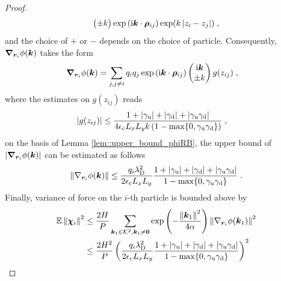 \begin{proof}
\begin{align*}
\begin{pmatrix}
 \pm k  \end{pmatrix}\exp{(\mathrm{i} \boldsymbol{k} \cdot \boldsymbol{\rho}_{ij})}\exp(k\left\lvert z_i-z_j\right\rvert)\;,\\
\end{align*}
and  the choice of $+$ or $-$ depends on the choice of particle. Consequently, $\boldsymbol{\nabla}_{\boldsymbol{r}_i} \phi(\boldsymbol{k})$ takes the form
\begin{align*}
  \boldsymbol{\nabla}_{\boldsymbol{r}_i} \phi(\boldsymbol{k})  &=\sum_{j,j\neq i}q_iq_j  \exp{(\mathrm{i} \boldsymbol{k} \cdot \boldsymbol{\rho}_{ij})} \begin{pmatrix} \mathrm{i} \boldsymbol{k} \\
 \pm k  \end{pmatrix}g(z_{ij})\;,
\end{align*}
where the estimates on $g(z_{ij})$ reads
\begin{align*}
  \left\lvert g(z_{ij})  \right\rvert&\leq  \frac{1+\left\lvert\gamma_{\mathrm{u}}\right\rvert+\left\lvert\gamma_{\mathrm{d}}\right\rvert+\left\lvert\gamma_{\mathrm{u}}\gamma_{\mathrm{d}}\right\rvert}{4\epsilon_{\mathrm{c}} L_xL_y k\left(1-\max\{0,\gamma_{\mathrm{u}}\gamma_{\mathrm{d}}\}\right)}\;,
\end{align*}
on the basis of Lemma \ref{lem::upper_bound_phiRB}, the upper bound of~$\lvert\boldsymbol{\nabla}_{\boldsymbol{r}_i} \phi(\boldsymbol{k})\rvert$ can be estimated as follows 
\begin{equation}
  \left\lVert\nabla_{\bm{r}_i}\phi(\bm{k})\right\rVert\leq \frac{q_i\lambda_{\mathrm{D}}^2}{2\epsilon_{\mathrm{c}} L_xL_y}    \frac{1+\left\lvert\gamma_{\mathrm{u}}\right\rvert+\left\lvert\gamma_{\mathrm{d}}\right\rvert+\left\lvert\gamma_{\mathrm{u}}\gamma_{\mathrm{d}}\right\rvert}{1-\max\{0,\gamma_{\mathrm{u}}\gamma_{\mathrm{d}}\}}\;.
\end{equation}
Finally,  variance of force on the $i$-th particle is bounded above by
\begin{align*}
   	\mathbb{E}\Norm{\V{\chi}_{i}}^2&\leq   \frac{2H}{P}\sum_{\bm{k}_1\in\fK^2, \bm{k}_1\neq \vzero}\exp\left(-\frac{\Norm{\vk_1}^2}{4\alpha}\right)\Norm{\nabla_{\bm{r}_i}\phi(\vk_1)}^2\\
    &\leq  \frac{2H^2}{P}\left(\frac{q_i\lambda_{\mrm{D}}^2}{2\epsilon_{\mrm{c}} L_xL_y}    \frac{1+\Abs{\gamma_{\mrm{u}}}+\Abs{\gamma_{\mrm{d}}}+\Abs{\gamma_{\mrm{u}}\gamma_{\mrm{d}}}}{1-\max\{0,\gamma_{\mrm{u}}\gamma_{\mrm{d}}\}}\right)^2\\

\end{align*}
\end{proof}
